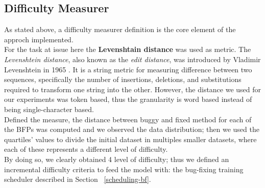 
\subsection{Difficulty Measurer}
As stated above, a difficulty measurer definition is the core element of the approch implemented.\\
For the task at issue here the \textbf{Levenshtain distance} was used as metric. The \textit{Levenshtein distance}, also known as the \textit{edit distance}, 
was introduced by Vladimir Levenshtein in 1965 \cite{Levenshtein_SPD66}. It is a string metric for measuring difference between two sequences, specifically the number of insertions, deletions, and substitutions
required to transform one string into the other. However, the distance we used for our experiments was token based, thus the granularity is word based instead of being single-character based.\\
Defined the measure, the distance between buggy and fixed method for each of the BFPs was computed and we observed the data distribution; then we used the quartiles' values to divide the initial dataset in multiples
smaller datasets, where each of these represents a different level of difficulty.\\
By doing so, we clearly obtained 4 level of difficulty; thus we defined an incremental difficulty criteria to feed the model with: 
the bug-fixing training scheduler described in Section ~\ref{scheduling-bf}.

